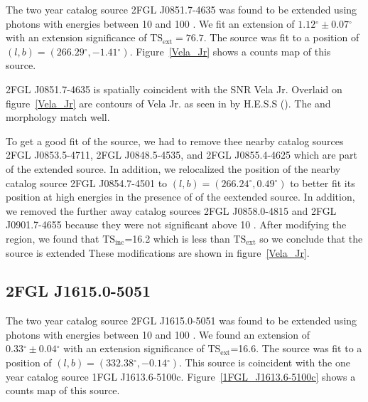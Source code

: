 \documentclass[12pt,preprint]{aastex}
\newcommand{\gev}{\text{GeV}\xspace}
\newcommand{\tev}{\text{TeV}\xspace}
\newcommand{\tsext}{{\ensuremath{\text{TS}_\text{ext}}}\xspace}
\newcommand{\tsinc}{\ensuremath{\text{TS}_\text{inc}}\xspace}
\renewcommand{\deg}{\ensuremath{^\circ}\xspace}
\begin{document}
The two year catalog source 2FGL J0851.7-4635 was found to be
extended using photons with energies between 10 \gev and 100
\gev. We fit an extension of $1.12\deg\pm0.07\deg$ with an extension
significance of $\tsext=76.7$.  The source was fit to a position of
$(l,b)=(266.29\deg,-1.41\deg)$.  Figure~\ref{Vela_Jr} shows a counts
map of this source.

2FGL J0851.7-4635 is spatially coincident with the SNR Vela Jr.  Overlaid
on figure~\ref{Vela_Jr} are contours of Vela Jr. as seen in \tev by
H.E.S.S (\cite{vela_jr_hess}).  The \gev and \tev morphology match well.


To get a good fit of the source, we had to remove thee nearby catalog
sources 2FGL J0853.5-4711, 2FGL J0848.5-4535, and 2FGL J0855.4-4625
which are part of the extended source.  In addition, we relocalized
the position of the nearby catalog source 2FGL J0854.7-4501 to
$(l,b)=(266.24\deg,0.49\deg)$ to better fit its position at high energies
in the presence of of the eextended source.  In addition, we removed the
further away catalog sources 2FGL J0858.0-4815 and 2FGL J0901.7-4655
because they were not significant above 10 \gev.  After modifying
the region, we found that \tsinc=16.2 which is less than \tsext so we
conclude that the source is extended These modifications are shown in
figure~\ref{Vela_Jr}.


\subsection{2FGL J1615.0-5051}
\label{section_2FGL_J1615.0-5051}


The two year catalog source 2FGL J1615.0-5051 was found to be
extended using photons with energies between 10 \gev and 100 \gev.
We found an extension of $0.33\deg\pm0.04\deg$ with an extension
significance of \tsext=16.6.  The source was fit to a position of
$(l,b)=(332.38\deg,-0.14\deg)$.  This source is coincident with the one
year catalog source 1FGL J1613.6-5100c.  Figure~\ref{1FGL_J1613.6-5100c}
shows a counts map of this source.
\end{document}

